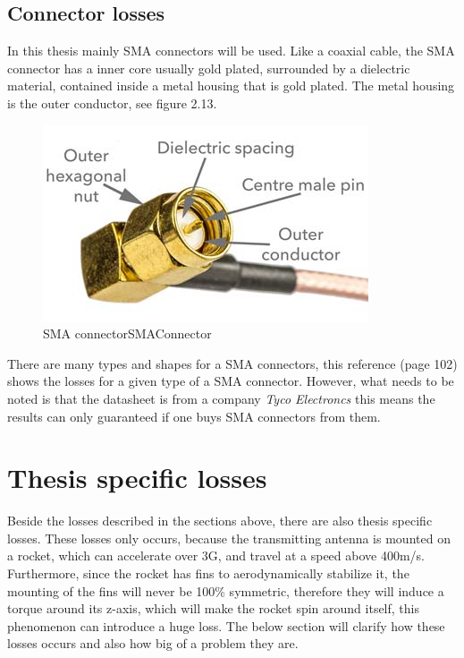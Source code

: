 \newpage

\subsection{Connector losses}
In this thesis mainly SMA connectors will be used. Like a coaxial cable, the SMA connector has a inner core usually gold plated, surrounded by a dielectric material, contained inside a metal housing that is gold plated. The metal housing is the outer conductor, see figure 2.13. 

\begin{figure}[h!]
\centering
\includegraphics[scale=0.6]{figures/SMAConnector.jpg}
\caption{SMA connector{SMAConnector}}
\end{figure}

There are many types and shapes for a SMA connectors, this reference \cite{SMAConnectorLosses} (page 102) shows the losses for a given type of a SMA connector. However, what needs to be noted is that the datasheet is from a company \textit{Tyco Electroncs} this means the results can only guaranteed if one buys SMA connectors from them. 

\section{Thesis specific losses}
Beside the losses described in the sections above, there are also thesis specific losses. These losses only occurs, because the transmitting antenna is mounted on a rocket, which can accelerate over 3G, and travel at a speed above 400m/s. Furthermore, since the rocket has fins to aerodynamically stabilize it, the mounting of the fins will never be 100\% symmetric, therefore they will induce a torque around its z-axis, which will make the rocket spin around itself, this phenomenon can introduce a huge loss. The below section will clarify how these losses occurs and also how big of a problem they are.

